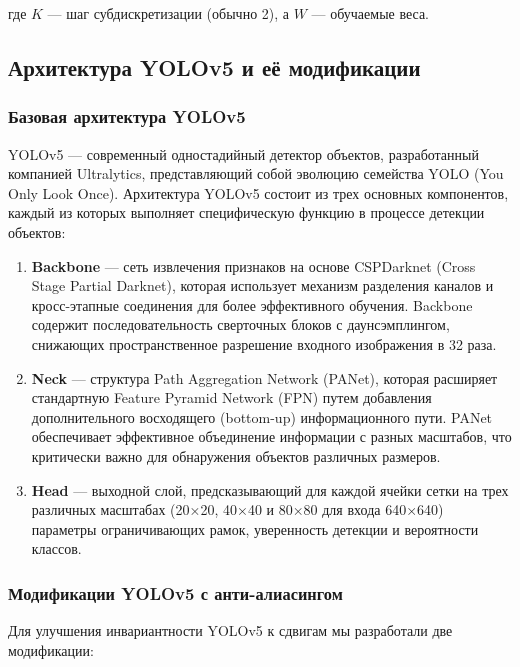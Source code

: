 где $K$ — шаг субдискретизации (обычно 2), а $W$ — обучаемые веса.

\subsection{Архитектура YOLOv5 и её модификации}
\label{sec:yolov5}

\subsubsection{Базовая архитектура YOLOv5}
\label{sec:yolov5:base}

YOLOv5 — современный одностадийный детектор объектов, разработанный компанией Ultralytics, представляющий собой эволюцию семейства YOLO (You Only Look Once). Архитектура YOLOv5 состоит из трех основных компонентов, каждый из которых выполняет специфическую функцию в процессе детекции объектов:

\begin{enumerate}
    \item \textbf{Backbone} — сеть извлечения признаков на основе CSPDarknet (Cross Stage Partial Darknet), которая использует механизм разделения каналов и кросс-этапные соединения для более эффективного обучения. Backbone содержит последовательность сверточных блоков с даунсэмплингом, снижающих пространственное разрешение входного изображения в 32 раза.
    
    \item \textbf{Neck} — структура Path Aggregation Network (PANet), которая расширяет стандартную Feature Pyramid Network (FPN) путем добавления дополнительного восходящего (bottom-up) информационного пути. PANet обеспечивает эффективное объединение информации с разных масштабов, что критически важно для обнаружения объектов различных размеров.
    
    \item \textbf{Head} — выходной слой, предсказывающий для каждой ячейки сетки на трех различных масштабах (20×20, 40×40 и 80×80 для входа 640×640) параметры ограничивающих рамок, уверенность детекции и вероятности классов.
\end{enumerate}

\subsubsection{Модификации YOLOv5 с анти-алиасингом}
\label{sec:yolov5:modifications}

Для улучшения инвариантности YOLOv5 к сдвигам мы разработали две модификации:

